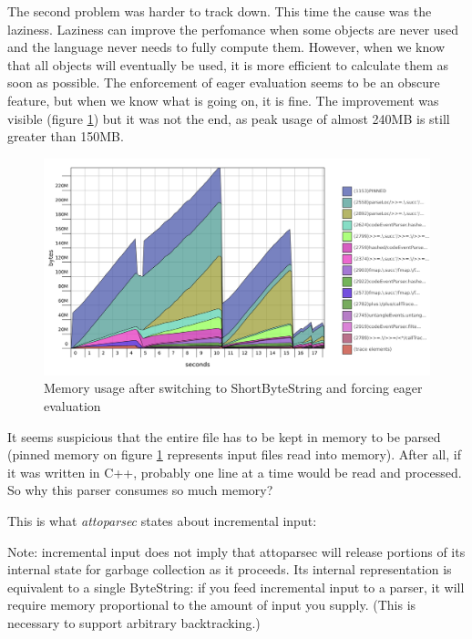 The second problem was harder to track down. This time the cause was the laziness.
Laziness can improve the perfomance when some objects are never used and the language never needs to fully compute them. 
However, when we know that all objects will eventually be used, it is more efficient
to calculate them as soon as possible. The enforcement of eager evaluation seems to be an obscure
feature, but when we know what is going on, it is fine.
The improvement was visible (figure \ref{fig:shortbytestring-strict}) but it was not the end, 
as peak usage of almost 240MB is still greater than 150MB.

\begin{figure}[hbt!]
 \centering
 \includegraphics[width=\textwidth]{png/shortbytestring-strict}
 \caption{Memory usage after switching to ShortByteString and forcing eager evaluation}
 \label{fig:shortbytestring-strict}
\end{figure}

It seems suspicious that the entire file has to be kept in memory to be parsed 
(pinned memory on figure \ref{fig:shortbytestring-strict} represents input files read into memory). 
After all, if it was written in C++, probably one line at a time would be read and processed. 
So why this parser consumes so much memory?

This is what \emph{attoparsec} states about incremental input:

\begin{displayquote}
Note: incremental input does not imply that attoparsec will release portions of its internal state for 
garbage collection as it proceeds. Its internal representation is equivalent to a single ByteString: 
if you feed incremental input to a parser, it will require memory proportional to the amount of input you supply. 
(This is necessary to support arbitrary backtracking.)
\end{displayquote}

